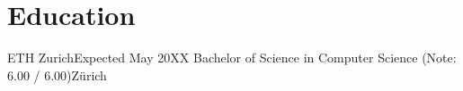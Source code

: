 \section{Education}
    \resumeSubHeadingListStart

    \resumeSubheading
    {ETH Zurich}{Expected May 20XX}
    {Bachelor of Science in Computer Science (Note: 6.00 / 6.00)}{Zürich}
    \resumeItemListStart
    \resumeItemListEnd

    \resumeSubHeadingListEnd
